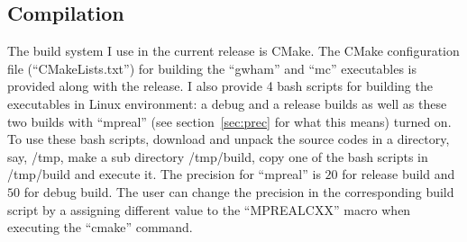 \subsection{Compilation} \label{sec:compile}
The build system I use in the current release is CMake. The CMake configuration
file (``CMakeLists.txt'') for building the ``gwham'' and ``mc'' executables is
provided along with the release. I also provide 4 bash scripts for building the
executables in Linux environment: a debug and a release builds as well as these
two builds with ``mpreal'' (see section~\ref{sec:prec} for what this means)
turned on. To use these bash scripts, download and unpack the source codes in a
directory, say, /tmp, make a sub directory /tmp/build, copy one of the bash
scripts in /tmp/build and execute it. The precision for ``mpreal'' is $20$ for
release build and $50$ for debug build. The user can change the precision in
the corresponding build script by a assigning different value to the
``MPREALCXX'' macro when executing the ``cmake'' command. 
